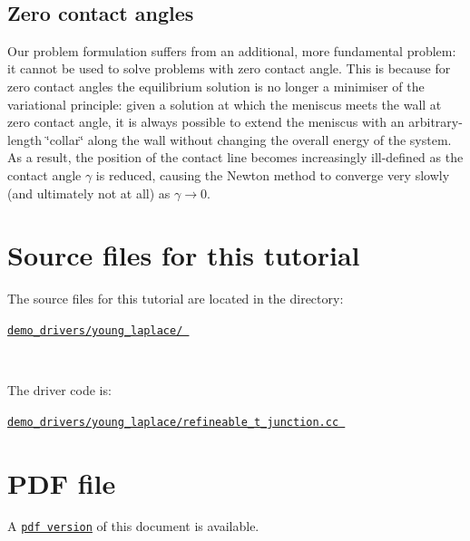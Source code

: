 ~\newline
 \hypertarget{index_zero}{}\subsection{Zero contact angles}\label{index_zero}
Our problem formulation suffers from an additional, more fundamental problem\+: it cannot be used to solve problems with zero contact angle. This is because for zero contact angles the equilibrium solution is no longer a minimiser of the variational principle\+: given a solution at which the meniscus meets the wall at zero contact angle, it is always possible to extend the meniscus with an arbitrary-\/length \char`\"{}collar\char`\"{} along the wall without changing the overall energy of the system. As a result, the position of the contact line becomes increasingly ill-\/defined as the contact angle $ \gamma $ is reduced, causing the Newton method to converge very slowly (and ultimately not at all) as $ \gamma \to 0. $



 

\hypertarget{index_sources}{}\section{Source files for this tutorial}\label{index_sources}

\begin{DoxyItemize}
\item The source files for this tutorial are located in the directory\+:~\newline
~\newline
 \begin{center} \href{../../../../demo_drivers/young_laplace/}{\tt demo\+\_\+drivers/young\+\_\+laplace/ } \end{center} ~\newline

\item The driver code is\+: ~\newline
~\newline
 \begin{center} \href{../../../../demo_drivers/young_laplace/refineable_t_junction.cc}{\tt demo\+\_\+drivers/young\+\_\+laplace/refineable\+\_\+t\+\_\+junction.\+cc } \end{center} 
\end{DoxyItemize}



 

 \hypertarget{index_pdf}{}\section{P\+D\+F file}\label{index_pdf}
A \href{../latex/refman.pdf}{\tt pdf version} of this document is available. 
